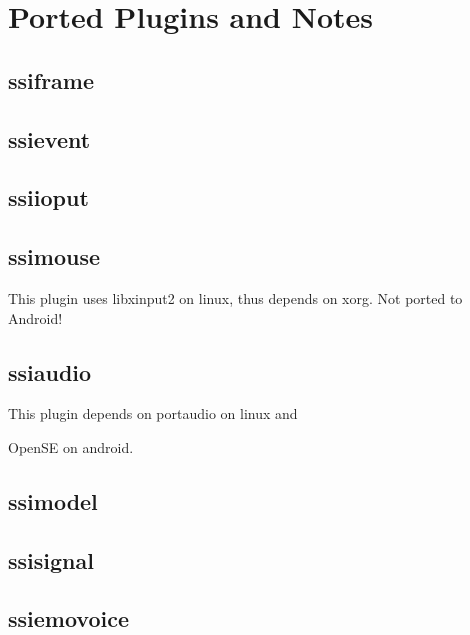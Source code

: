 \documentclass[
10pt, %
a4paper, %
oneside, %
headinclude,footinclude, %
BCOR5mm, %
]{scrartcl}
\begin{document}

\newpage %



\section{Ported Plugins and Notes}

\subsection{ssiframe}

\subsection{ssievent}

\subsection{ssiioput}

\subsection{ssimouse}
This plugin uses libxinput2 on linux, thus depends on xorg.
Not ported to Android!

\subsection{ssiaudio}
This plugin depends on portaudio on linux and

OpenSE on android.
\subsection{ssimodel}

\subsection{ssisignal}

\subsection{ssiemovoice}
\end{document}
